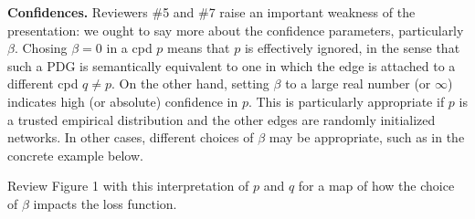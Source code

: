 \documentclass{article}
\theoremstyle{plain}
\theoremstyle{definition}
\newcommand{\dg}[1]{\mathbdcal{#1}}
\begin{document}
\textbf{Confidences.}
Reviewers \#5 and \#7 raise an important weakness of the presentation: we ought to say more about the confidence parameters, particularly $\beta$.
Chosing $\beta=0$ in a cpd $p$
means that $p$ is effectively ignored, in the sense that such a PDG is semantically equivalent to one in which the edge is attached to a different cpd $q \ne p$.
%
On the other hand, setting $\beta$ to a large real number (or $\infty$) indicates high (or absolute) confidence in $p$.  This is particularly appropriate if $p$ is a trusted empirical distribution and the other edges are randomly initialized networks.
In other cases, different choices of $\beta$ may be appropriate, such as in the concrete example below.

Review Figure 1 with this interpretation of $p$ and $q$ for a map of how the choice of $\beta$
impacts the loss function.
%

\end{document}
